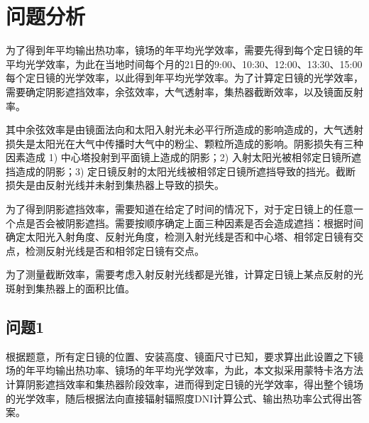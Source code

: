 \section{问题分析}
为了得到年平均输出热功率，镜场的年平均光学效率，需要先得到每个定日镜的年平均光学效率，为此在当地时间每个月的21日的9:00、10:30、12:00、13:30、15:00每个定日镜的光学效率，以此得到年平均光学效率。为了计算定日镜的光学效率，需要确定阴影遮挡效率，余弦效率，大气透射率，集热器截断效率，以及镜面反射率。

其中余弦效率是由镜面法向和太阳入射光未必平行所造成的影响造成的，大气透射损失是太阳光在大气中传播时大气中的粉尘、颗粒所造成的影响。阴影损失有三种因素造成 1) 中心塔投射到平面镜上造成的阴影；2) 入射太阳光被相邻定日镜所遮挡造成的阴影；3) 定日镜反射的太阳光线被相邻定日镜所遮挡导致的挡光。截断损失是由反射光线并未射到集热器上导致的损失。

为了得到阴影遮挡效率，需要知道在给定了时间的情况下，对于定日镜上的任意一个点是否会被阴影遮挡。需要按顺序确定上面三种因素是否会造成遮挡：根据时间确定太阳光入射角度、反射光角度，检测入射光线是否和中心塔、相邻定日镜有交点，检测反射光线是否和相邻定日镜有交点。

为了测量截断效率，需要考虑入射反射光线都是光锥，计算定日镜上某点反射的光斑射到集热器上的面积比值。
\subsection{问题1}
根据题意，所有定日镜的位置、安装高度、镜面尺寸已知，要求算出此设置之下镜场的年平均输出热功率、镜场的年平均光学效率，为此，本文拟采用蒙特卡洛方法计算阴影遮挡效率和集热器阶段效率，进而得到定日镜的光学效率，得出整个镜场的光学效率，随后根据法向直接辐射辐照度DNI计算公式、输出热功率公式得出答案。
